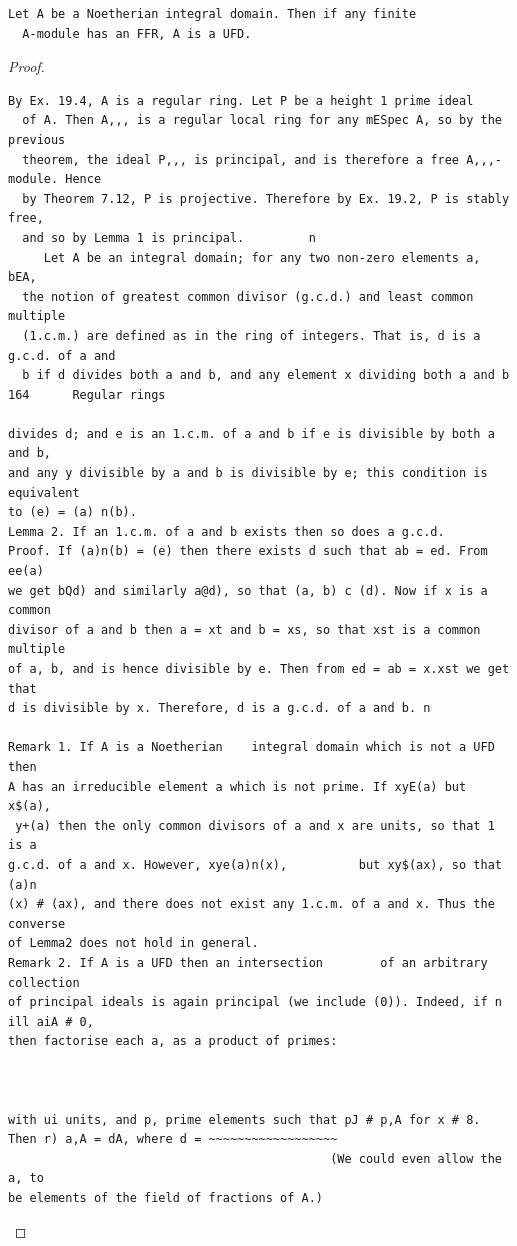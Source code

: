 \begin{theorem}\label{mcrt-auto-theorem-20-4}\uses{}
\begin{verbatim}
Let A be a Noetherian integral domain. Then if any finite
  A-module has an FFR, A is a UFD.
\end{verbatim}
\end{theorem}
\begin{proof}
\begin{verbatim}
By Ex. 19.4, A is a regular ring. Let P be a height 1 prime ideal
  of A. Then A,,, is a regular local ring for any mESpec A, so by the previous
  theorem, the ideal P,,, is principal, and is therefore a free A,,,-module. Hence
  by Theorem 7.12, P is projective. Therefore by Ex. 19.2, P is stably free,
  and so by Lemma 1 is principal.         n
     Let A be an integral domain; for any two non-zero elements a, bEA,
  the notion of greatest common divisor (g.c.d.) and least common multiple
  (1.c.m.) are defined as in the ring of integers. That is, d is a g.c.d. of a and
  b if d divides both a and b, and any element x dividing both a and b
164      Regular rings

divides d; and e is an 1.c.m. of a and b if e is divisible by both a and b,
and any y divisible by a and b is divisible by e; this condition is equivalent
to (e) = (a) n(b).
Lemma 2. If an 1.c.m. of a and b exists then so does a g.c.d.
Proof. If (a)n(b) = (e) then there exists d such that ab = ed. From ee(a)
we get bQd) and similarly a@d), so that (a, b) c (d). Now if x is a common
divisor of a and b then a = xt and b = xs, so that xst is a common multiple
of a, b, and is hence divisible by e. Then from ed = ab = x.xst we get that
d is divisible by x. Therefore, d is a g.c.d. of a and b. n

Remark 1. If A is a Noetherian    integral domain which is not a UFD then
A has an irreducible element a which is not prime. If xyE(a) but x$(a),
 y+(a) then the only common divisors of a and x are units, so that 1 is a
g.c.d. of a and x. However, xye(a)n(x),          but xy$(ax), so that (a)n
(x) # (ax), and there does not exist any 1.c.m. of a and x. Thus the converse
of Lemma2 does not hold in general.
Remark 2. If A is a UFD then an intersection        of an arbitrary collection
of principal ideals is again principal (we include (0)). Indeed, if n ill aiA # 0,
then factorise each a, as a product of primes:



with ui units, and p, prime elements such that pJ # p,A for x # 8.
Then r) a,A = dA, where d = ~~~~~~~~~~~~~~~~~~
                                             (We could even allow the a, to
be elements of the field of fractions of A.)
\end{verbatim}
\end{proof}


